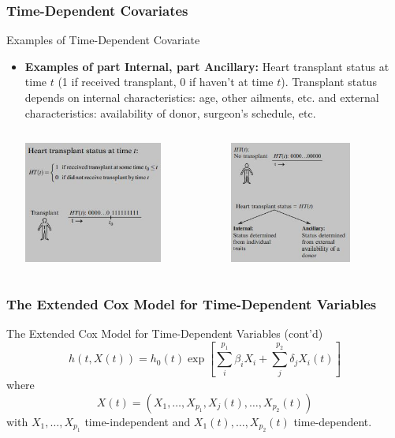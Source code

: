 \documentclass{beamer}
\theoremstyle{definition}
\begin{document}
\begin{frame}
\frametitle{Time-Dependent Covariates}
\begin{block}{Examples of Time-Dependent Covariate}
\begin{itemize}
\item \textbf{Examples of part Internal, part Ancillary:} Heart transplant status at time $t$ (1 if received transplant, 0 if haven't at time $t$). Transplant status depends on internal characteristics:  age, other ailments, etc. and external characteristics: availability of donor, surgeon's schedule, etc.
\begin{columns}
    \begin{column}{0.48\textwidth}
        \includegraphics[width =\textwidth, height=4cm]{CH6_HT.JPG}
    \end{column}
    \hspace{-10pt}
    \begin{column}{0.48\textwidth}
         \includegraphics[width =\textwidth, height=4cm]{CH6_HTS2.JPG}
    \end{column}
\end{columns}
\end{itemize}
\end{block}
\end{frame}

\begin{frame}
\frametitle{The Extended Cox Model for Time-Dependent Variables}
\begin{block}{The Extended Cox Model for Time-Dependent Variables (cont'd)}
\[
h(t,X(t)) = h_0(t) \exp\left[\sum_i^{p_1} \beta_i X_i + \sum_j^{p_2} \delta_j X_i(t)\right]
\]
where
\[
X(t)=(X_1,\ldots,X_{p_1},X_j(t),\ldots,X_{p_2}(t))
\]
with $X_1,\ldots,X_{p_1}$ time-independent and $X_1(t),\ldots,X_{p_2}(t)$ time-dependent.
\end{block}
\end{frame}
\end{document}
